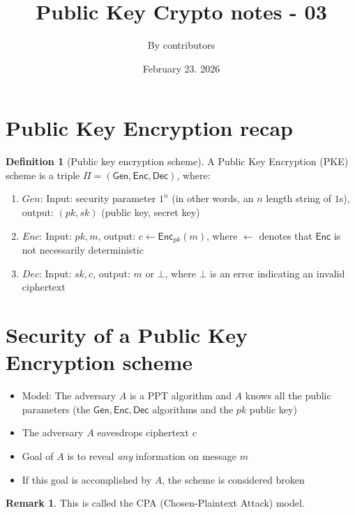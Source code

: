 \documentclass[11pt]{article}
\theoremstyle{definition}
\newtheorem{definition}{Definition}[section]
\newtheorem{remark}{Remark}[section]
\theoremstyle{proof}
\newcommand{\Gen}{\mathsf{Gen}}
\newcommand{\Enc}{\mathsf{Enc}}
\newcommand{\Dec}{\mathsf{Dec}}
\begin{document}
\title{Public Key Crypto notes - 03}
\author{By contributors}
\date{February 23. 2026}
\maketitle

\section{Public Key Encryption recap}

\begin{definition}[Public key encryption scheme]
	\item A Public Key Encryption (PKE) scheme is a triple $\Pi = (\Gen, \Enc, \Dec)$, where:
	\begin{enumerate}
		\item $Gen$: Input: security parameter $1^n$ (in other words, an $n$ length string of $1$s), output: $(pk, sk)$ (public key, secret key)
		\item $Enc$: Input: $pk, m$, output: $c \leftarrow \Enc_{pk}(m)$, where $\leftarrow$ denotes that $\Enc$ is not necessarily deterministic
		\item $Dec$: Input: $sk, c$, output: $m$ or $\bot$, where $\bot$ is an error indicating an invalid ciphertext
	\end{enumerate}
\end{definition}

\section{Security of a Public Key Encryption scheme}

\begin{itemize}
	\item Model: The adversary $A$ is a PPT algorithm and $A$ knows all the public parameters (the $\Gen, \Enc, \Dec$ algorithms and the $pk$ public key)
	\item The adversary $A$ eavesdrops ciphertext $c$
	\item Goal of $A$ is to reveal \emph{any} information on message $m$
	\item If this goal is accomplished by $A$, the scheme is considered broken
\end{itemize}

\begin{remark}
	This is called the CPA (Chosen-Plaintext Attack) model.
\end{remark}
\end{document}
